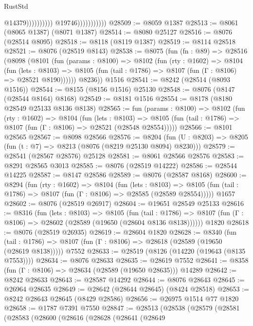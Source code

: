 \begin{lexlean}{RustStd}
\begin{coremodule}
                                              @14379))))))))))
                          @19746)))))))))))
@28509 := @8059 @1387
@28513 := @8061 (@8065 @1387) (@8071 @1387)
@28514 := @8080 @25127
@28516 := @8076 (@28514 @8095)
@28518 := @8118 (@8119 @1387)
@28519 := @8114 @28518
@28521 := @8076 (@28519 @8143)
@28538 := @8075
    (fun (fn : @89) =>
    @28516
      (@8098
        (@8101
          (fun (params : @8100) =>
          @8102
            (fun (rty : @1602) =>
            @8104
              (fun (lets : @8103) =>
              @8105 (fun (tail : @1786) => @8107 (fun (Γ : @8106) => @28521 @8190))))))
        @8236))
    @1516
@28541 := @8242 (@28514 (@8093 @1516))
@28544 := @8155 (@8156 @1516) @25130
@28548 := @8076 (@8147 (@28544 @8164) @8168)
@28549 := @8181 @1516
@28554 := @8178 (@8180 @28549 @25133 @8136 @8138)
@28565 := fun (params : @8100) =>
  @8102
    (fun (rty : @1602) =>
    @8104
      (fun (lets : @8103) =>
      @8105 (fun (tail : @1786) => @8107 (fun (Γ : @8106) => @28521 (@28548 @28554)))))
@28566 := @8101 @28565
@28567 := @8098 @28566
@28576 := @8204
    (fun (U : @8203) => @8205 (fun (t : @7) => @8213 (@8076 (@8219 @25130 @8094) @8230)))
@28579 := @28541 (@28567 @28576) @25128
@28581 := @8061 @28566 @28576
@28583 := @8291 @28565 @3013
@28585 := @8076 (@28519 @14222)
@28586 := @28544 @14225
@28587 := @8147 @28586
@28589 := @8076 (@28587 @8168)
@28600 := @8294
    (fun (rty : @1602) =>
    @8104
      (fun (lets : @8103) =>
      @8105 (fun (tail : @1786) => @8107 (fun (Γ : @8106) => @28585 (@28589 @28554)))))
    @1657
@28602 := @8076 (@28519 @26917)
@28604 := @19651 @28549 @25133
@28616 := @8316
    (fun (lets : @8103) =>
    @8105
      (fun (tail : @1786) =>
      @8107 (fun (Γ : @8106) => @28602 (@28589 (@19650 (@28604 @8136 @8138))))))
    @1820
@28618 := @8076 (@28519 @26935)
@28619 := @28604 @1820
@28628 := @8340
    (fun (tail : @1786) => @8107 (fun (Γ : @8106) => @28618 (@28589 (@19650 (@28619 @8138)))))
    @7552
@28633 := @28519 (@8126 (@14220 (@19643 (@8135 @7553))))
@28634 := @8076 @28633
@28635 := @28619 @7552
@28641 := @8358 (fun (Γ : @8106) => @28634 (@28589 (@19650 @28635))) @14289
@28642 := @8242 @28633
@28643 := @28587 @14292
@28644 := @8076 @28643
@28645 := @26964 @28635
@28649 := @28642 (@28644 @28645) (@8424 @28518)
@28653 := @8242 @28643 @28645 (@8429 @28586)
@28656 := @26975 @1514 @77 @1820
@28658 := @1787 @7391 @7550
@28847 := @28513
    (@28538
      (@28579
        (@28581
          (@28583
            (@28600
              (@28616
                (@28628
                  (@28641
                    (@28649

\end{coremodule}
\end{lexlean}
